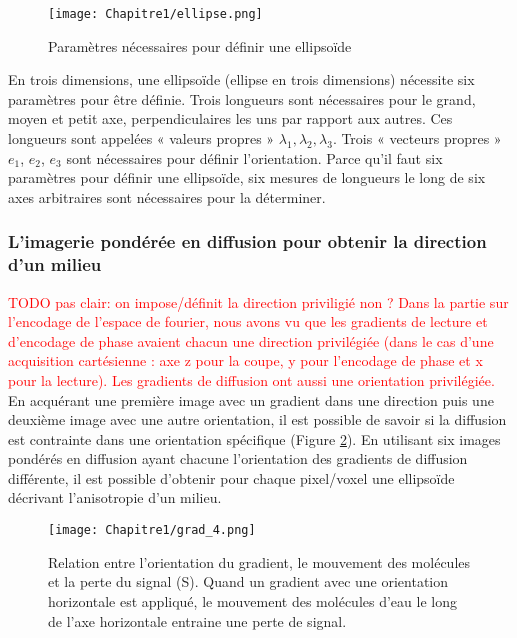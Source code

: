 \begin{figure}[!htbp]
  \begin{center}
    \texttt{[image: Chapitre1/ellipse.png]}
     \end{center}
    \caption{Paramètres nécessaires pour définir une ellipsoïde}
  \label{fig:ellipse}
\end{figure}

En trois dimensions, une ellipsoïde (ellipse en trois dimensions) nécessite six paramètres pour être définie. Trois longueurs sont nécessaires pour le grand, moyen et petit axe, perpendiculaires les uns par rapport aux autres. Ces longueurs sont appelées « valeurs propres » $\lambda_1, \lambda_2, \lambda_3$. Trois « vecteurs propres » $e_1$, $e_2$, $e_3$ sont nécessaires pour définir l’orientation. Parce qu’il faut six paramètres pour définir une ellipsoïde, six mesures de longueurs le long de six axes arbitraires sont nécessaires pour la déterminer.

\subsubsection{L’imagerie pondérée en diffusion pour obtenir la direction d’un milieu}

\textcolor{red}{TODO pas clair: on impose/définit la direction priviligié non ? Dans la partie sur l’encodage de l’espace de fourier, nous avons vu que les gradients de lecture et d’encodage de phase avaient chacun une direction privilégiée (dans le cas d’une acquisition cartésienne : axe z pour la coupe, y pour l’encodage de phase et x pour la lecture).  Les gradients de diffusion ont aussi une orientation privilégiée.} En acquérant une première image avec un gradient dans une direction puis une deuxième image avec une autre orientation, il est possible de savoir si la diffusion est contrainte dans une orientation spécifique (Figure \ref{fig:grad_4}). En utilisant six images pondérés en diffusion ayant chacune l’orientation des gradients de diffusion différente, il est possible d’obtenir pour chaque pixel/voxel une ellipsoïde décrivant l’anisotropie d’un milieu.

\begin{figure}[!htbp]
  \begin{center}
    \texttt{[image: Chapitre1/grad\_4.png]}
     \end{center}
    \caption{Relation entre l’orientation du gradient, le mouvement des molécules et la perte du signal (S). Quand un gradient avec une orientation horizontale est appliqué, le mouvement des molécules d’eau le long de l’axe horizontale entraine une perte de signal. }
  \label{fig:grad_4}
\end{figure}


